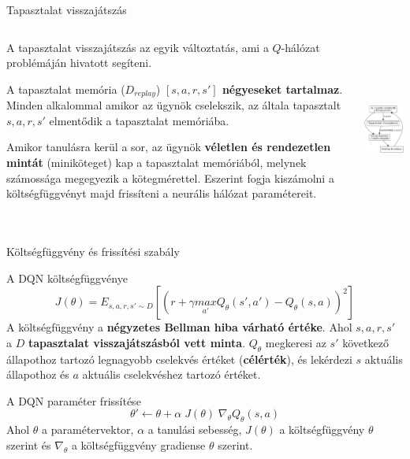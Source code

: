 \documentclass[english, aspectratio=169]{beamer}
\begin{document}
\begin{frame}{Tapasztalat visszajátszás}
\begin{columns}
\begin{column}{.65\textwidth}
A tapasztalat visszajátszás az egyik változtatás, ami a $Q$-hálózat problémáján hivatott segíteni.\par\smallskip
A tapasztalat memória ($D_{replay}$) \textbf{$[s,a,r,s']$ négyeseket tartalmaz}. Minden alkalommal amikor az ügynök cselekszik, az általa tapasztalt $s, a, r, s'$ elmentődik a tapasztalat memóriába.\par\smallskip
Amikor tanulásra kerül a sor, az ügynök \textbf{véletlen és rendezetlen mintát} (miniköteget) kap a tapasztalat memóriából, melynek számossága megegyezik a kötegmérettel. Eszerint fogja kiszámolni a költségfüggvényt majd frissíteni a neurális hálózat paramétereit.
\end{column}
\begin{column}{.35\textwidth}
\begin{center}
\includegraphics[height=6cm, keepaspectratio]{graphs/ql_4.png}
\end{center}
\end{column}
\end{columns}
\end{frame}

\begin{frame}{Költségfüggvény és frissítési szabály}
\begin{block}{A DQN költségfüggvénye}
\[
J(\theta) = E_{s,a,r,s' \sim D} \left[ \left( r + \gamma \underset{a'}{max} Q_\theta(s',a') - Q_\theta(s,a) \right)^2 \right]
\]
A költségfüggvény a \textbf{négyzetes Bellman hiba várható értéke}. Ahol $s,a,r,s'$ a $D$ \textbf{tapasztalat visszajátszásból vett minta}. $Q_\theta$ megkeresi az $s'$ következő állapothoz tartozó legnagyobb cselekvés értéket (\textbf{célérték}), és lekérdezi $s$ aktuális állapothoz és $a$ aktuális cselekvéshez tartozó értéket. 
\end{block}
\begin{block}{A DQN paraméter frissítése}
\[
\theta' \leftarrow \theta + \alpha \; J(\theta) \; \nabla_\theta Q_\theta(s,a)
\]
Ahol $\theta$ a paramétervektor, $\alpha$ a tanulási sebesség, $J(\theta)$ a költségfüggvény $\theta$ szerint és $\nabla_\theta$ a költségfüggvény gradiense $\theta$ szerint.
\end{block}
\end{frame}
\end{document}
